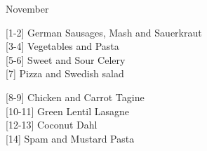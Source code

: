 		\begin{menu}{November}
    
    \begin{recipelist}
    
        {\scriptsize[1-2]} German Sausages, Mash and Sauerkraut\\
        {\scriptsize[3-4]} Vegetables and Pasta\\
        {\scriptsize[5-6]} Sweet and Sour Celery\\
        {\scriptsize[7]} Pizza and Swedish salad\\%
    \end{recipelist}%
    \begin{recipelist}
    
        {\scriptsize[8-9]} Chicken and Carrot Tagine\\
        {\scriptsize[10-11]} Green Lentil Lasagne\\
        {\scriptsize[12-13]} Coconut Dahl\\
        {\scriptsize[14]} Spam and Mustard Pasta\\%
    \end{recipelist}\par%
  

\end{menu}
